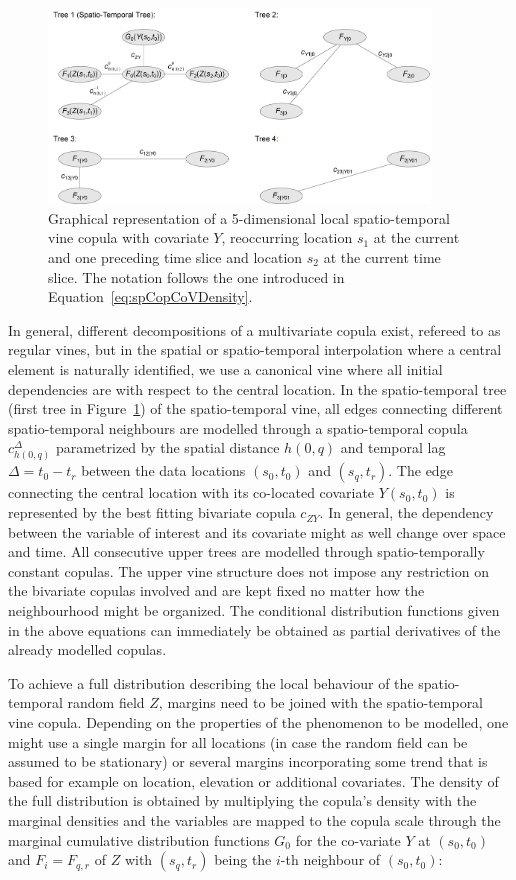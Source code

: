 \documentclass[article,nojss]{jss}
\begin{document}
\begin{figure}
\center
\includegraphics[width=0.9\textwidth]{can_Vine.png}
\caption{Graphical representation of a 5-dimensional local spatio-temporal vine copula with covariate $Y$, reoccurring location $s_1$ at the current and one preceding time slice and location $s_2$ at the current time slice. The notation follows the one introduced in Equation~\ref{eq:spCopCoVDensity}.\label{fig:canVine}}
\end{figure}

In general, different decompositions of a multivariate copula exist, refereed to as regular vines, but in the spatial or spatio-temporal interpolation where a central element is naturally identified, we use a canonical vine where all initial dependencies are with respect to the central location. In the spatio-temporal tree (first tree in Figure~\ref{fig:canVine}) of the spatio-temporal vine, all edges connecting different spatio-temporal neighbours are modelled through a spatio-temporal copula $c^\Delta_{h(0,q)}$ parametrized by the spatial distance $h(0, q)$ and temporal lag $\Delta=t_0-t_r$ between the data locations $(s_0,t_0)$ and $(s_q,t_r)$. The edge connecting the central location with its co-located covariate $Y(s_0,t_0)$ is represented by the best fitting bivariate copula $c_{ZY}$. In general, the dependency between the variable of interest and its covariate might as well change over space and time. All consecutive upper trees are modelled through spatio-temporally constant copulas. The upper vine structure does not impose any restriction on the bivariate copulas involved and are kept fixed no matter how the neighbourhood might be organized. The conditional distribution functions given in the above equations can immediately be obtained as partial derivatives of the already modelled copulas. 

To achieve a full distribution describing the local behaviour of the spatio-temporal random field $Z$, margins need to be joined with the spatio-temporal vine copula. Depending on the properties of the phenomenon to be modelled, one might use a single margin for all locations (in case the random field can be assumed to be stationary) or several margins incorporating some trend that is based for example on location, elevation or additional covariates. The density of the full distribution is obtained by multiplying the copula's density with the marginal densities and the variables are mapped to the copula scale through the marginal cumulative distribution functions $G_{0}$ for the co-variate $Y$ at $(s_0,t_0)$ and $F_i=F_{q,r}$ of $Z$ with $(s_q,t_r) $ being the $i$-th neighbour of $(s_0,t_0)$:
\end{document}
